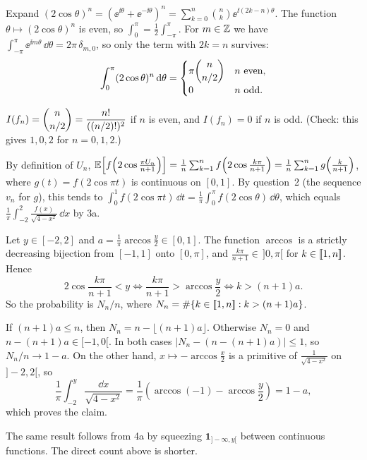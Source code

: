 \documentclass[11pt,a4paper]{article}
\begin{document}
Expand $(2\cos\theta)^n = (\ee^{\ii\theta} + \ee^{-\ii\theta})^n
= \sum_{k=0}^n \binom nk \ee^{\ii(2k-n)\theta}$. The function $\theta \mapsto (2\cos\theta)^n$
is even, so $\int_0^\pi = \frac12\int_{-\pi}^{\pi}$. For $m \in \mathbb{Z}$ we have
$\int_{-\pi}^{\pi}\ee^{\ii m\theta}\,\dd\theta = 2\pi\,\delta_{m,0}$, so only the term with
$2k = n$ survives:
\[
  \int_0^\pi (2\cos\theta)^n\,\mathrm{d}\theta =
  \begin{cases} \pi\dbinom{n}{n/2} & n \text{ even},\\[4pt] 0 & n \text{ odd}.\end{cases}
\]
\begin{result}
$I(f_n) = \dbinom{n}{n/2} = \dfrac{n!}{((n/2)!)^2}$ if $n$ is even, and $I(f_n) = 0$ if $n$ is
odd. (Check: this gives $1, 0, 2$ for $n = 0,1,2$.)
\end{result}

By definition of $U_n$,
$\mathbb{E}\!\left[f\!\left(2\cos\frac{\pi U_n}{n+1}\right)\right]
 = \frac1n\sum_{k=1}^n f\!\left(2\cos\frac{k\pi}{n+1}\right)
 = \frac1n\sum_{k=1}^n g\!\left(\frac{k}{n+1}\right)$,
where $g(t) = f(2\cos\pi t)$ is continuous on $[0,1]$. By question~2 (the sequence $v_n$ for
$g$), this tends to
$\int_0^1 f(2\cos\pi t)\,\dd t = \frac1\pi\int_0^\pi f(2\cos\theta)\,\dd\theta$, which equals
$\frac1\pi\int_{-2}^{2}\frac{f(x)}{\sqrt{4-x^2}}\,\dd x$ by 3a.

Let $y \in [-2,2]$ and $a = \frac1\pi\arccos\frac y2 \in [0,1]$. The function $\arccos$ is a
strictly decreasing bijection from $[-1,1]$ onto $[0,\pi]$, and $\frac{k\pi}{n+1} \in \,]0,\pi[$
for $k \in [\![1,n]\!]$. Hence
\[
  2\cos\frac{k\pi}{n+1} < y \iff \frac{k\pi}{n+1} > \arccos\frac y2 \iff k > (n+1)a.
\]
So the probability is $N_n/n$, where $N_n = \#\{k\in[\![1,n]\!] : k > (n+1)a\}$.

If $(n+1)a \le n$, then $N_n = n - \lfloor (n+1)a\rfloor$. Otherwise $N_n = 0$ and
$n - (n+1)a \in [-1,0[$. In both cases $|N_n - (n - (n+1)a)| \le 1$, so
$N_n/n \to 1 - a$. On the other hand, $x \mapsto -\arccos\frac x2$ is a primitive of
$\frac1{\sqrt{4-x^2}}$ on $]-2,2[$, so
\[
  \frac1\pi\int_{-2}^{y}\frac{\dd x}{\sqrt{4-x^2}}
  = \frac1\pi\left(\arccos(-1) - \arccos\frac y2\right) = 1 - a,
\]
which proves the claim.
\begin{remark}
The same result follows from 4a by squeezing $\mathbf 1_{]-\infty,y[}$ between continuous
functions. The direct count above is shorter.
\end{remark}
\end{document}
